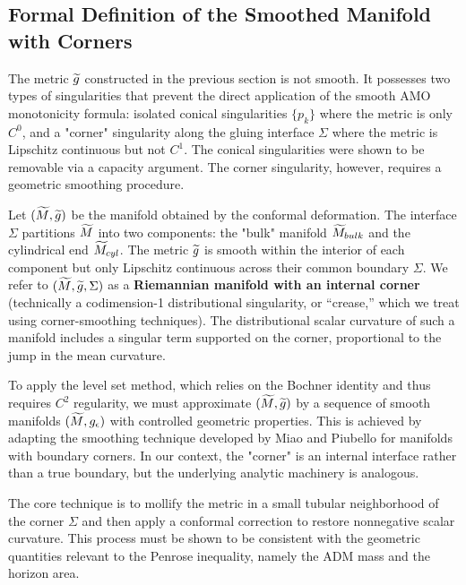 \subsection{Formal Definition of the Smoothed Manifold with Corners}
\label{sec:SmoothedManifold}

The metric $\widetilde{g}$ constructed in the previous section is not smooth. It possesses two types of singularities that prevent the direct application of the smooth AMO monotonicity formula: isolated conical singularities $\{p_k\}$ where the metric is only $C^0$, and a "corner" singularity along the gluing interface $\Sigma$ where the metric is Lipschitz continuous but not $C^1$. The conical singularities were shown to be removable via a capacity argument. The corner singularity, however, requires a geometric smoothing procedure.

\begin{definition}
Let $(\widetilde{M}, \widetilde{g})$ be the manifold obtained by the conformal deformation. The interface $\Sigma$ partitions $\widetilde{M}$ into two components: the "bulk" manifold $\widetilde{M}_{bulk}$ and the cylindrical end $\widetilde{M}_{cyl}$. The metric $\widetilde{g}$ is smooth within the interior of each component but only Lipschitz continuous across their common boundary $\Sigma$. We refer to $(\widetilde{M}, \widetilde{g}, \Sigma)$ as a \textbf{Riemannian manifold with an internal corner} (technically a codimension-1 distributional singularity, or ``crease,'' which we treat using corner-smoothing techniques). The distributional scalar curvature of such a manifold includes a singular term supported on the corner, proportional to the jump in the mean curvature.
\end{definition}

To apply the level set method, which relies on the Bochner identity and thus requires $C^2$ regularity, we must approximate $(\widetilde{M}, \widetilde{g})$ by a sequence of smooth manifolds $(\widetilde{M}, g_{\epsilon})$ with controlled geometric properties. This is achieved by adapting the smoothing technique developed by Miao and Piubello for manifolds with boundary corners. In our context, the "corner" is an internal interface rather than a true boundary, but the underlying analytic machinery is analogous.

The core technique is to mollify the metric in a small tubular neighborhood of the corner $\Sigma$ and then apply a conformal correction to restore nonnegative scalar curvature. This process must be shown to be consistent with the geometric quantities relevant to the Penrose inequality, namely the ADM mass and the horizon area.

